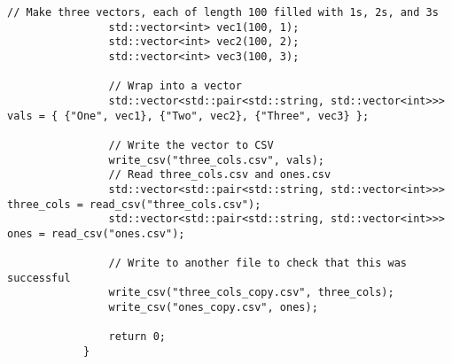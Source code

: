 \documentclass[a4paper]{article}
\begin{document}
\begin{scriptsize}
\begin{lstlisting}[caption={read and write '.csv' in one '.cpp' file}, label=lst:rcode]
				// Make three vectors, each of length 100 filled with 1s, 2s, and 3s
				std::vector<int> vec1(100, 1);
				std::vector<int> vec2(100, 2);
				std::vector<int> vec3(100, 3);
				
				// Wrap into a vector
				std::vector<std::pair<std::string, std::vector<int>>> vals = { {"One", vec1}, {"Two", vec2}, {"Three", vec3} };
				
				// Write the vector to CSV
				write_csv("three_cols.csv", vals);
				// Read three_cols.csv and ones.csv
				std::vector<std::pair<std::string, std::vector<int>>> three_cols = read_csv("three_cols.csv");
				std::vector<std::pair<std::string, std::vector<int>>> ones = read_csv("ones.csv");
				
				// Write to another file to check that this was successful
				write_csv("three_cols_copy.csv", three_cols);
				write_csv("ones_copy.csv", ones);
				
				return 0;
			}
			
			
		\end{lstlisting}
	\end{scriptsize}	
\end{document}
